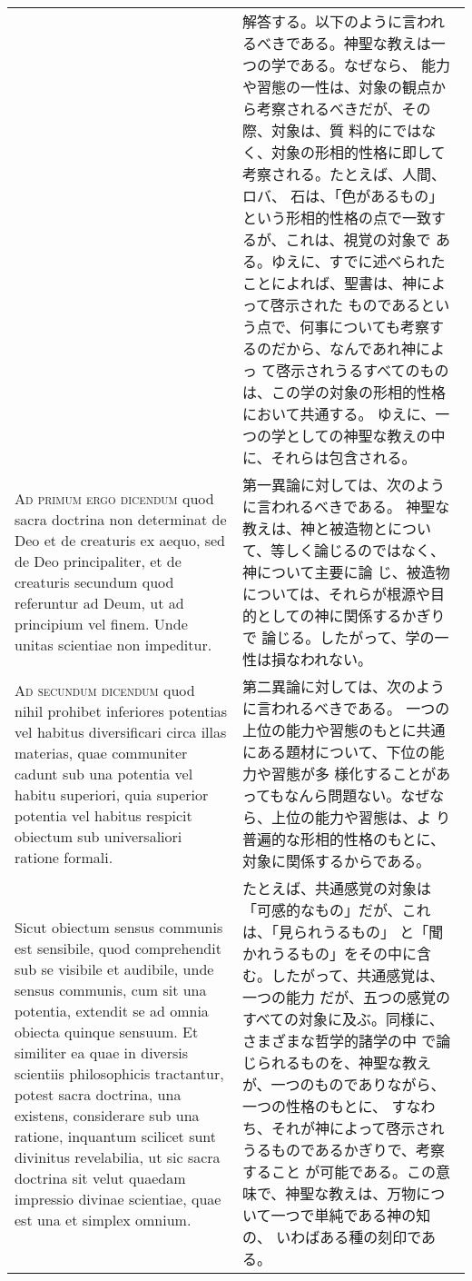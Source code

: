 \documentclass[10pt]{jsarticle} %
\begin{document}
\begin{longtable}{p{21em}p{21em}}
&


解答する。以下のように言われるべきである。神聖な教えは一つの学である。なぜなら、
能力や習態の一性は、対象の観点から考察されるべきだが、その際、対象は、質
料的にではなく、対象の形相的性格に即して考察される。たとえば、人間、ロバ、
石は、「色があるもの」という形相的性格の点で一致するが、これは、視覚の対象で
ある。ゆえに、すでに述べられたことによれば、聖書は、神によって啓示された
ものであるという点で、何事についても考察するのだから、なんであれ神によっ
て啓示されうるすべてのものは、この学の対象の形相的性格において共通する。
ゆえに、一つの学としての神聖な教えの中に、それらは包含される。

\\


{\scshape Ad primum ergo dicendum} quod sacra doctrina
non determinat de Deo et de creaturis ex aequo, sed de Deo
principaliter, et de creaturis secundum quod referuntur ad Deum, ut ad
principium vel finem. Unde unitas scientiae non impeditur.


&

第一異論に対しては、次のように言われるべきである。
神聖な教えは、神と被造物とについて、等しく論じるのではなく、神について主要に論
 じ、被造物については、それらが根源や目的としての神に関係するかぎりで
 論じる。したがって、学の一性は損なわれない。
\\


{\scshape Ad secundum dicendum} quod nihil prohibet
inferiores potentias vel habitus diversificari circa illas materias,
quae communiter cadunt sub una potentia vel habitu superiori, quia
superior potentia vel habitus respicit obiectum sub universaliori
ratione formali. 


&

第二異論に対しては、次のように言われるべきである。
一つの上位の能力や習態のもとに共通にある題材について、下位の能力や習態が多
 様化することがあってもなんら問題ない。なぜなら、上位の能力や習態は、よ
 り普遍的な形相的性格のもとに、対象に関係するからである。

\\

Sicut obiectum sensus communis est sensibile, quod
comprehendit sub se visibile et audibile, unde sensus communis, cum sit
una potentia, extendit se ad omnia obiecta quinque sensuum. Et similiter
ea quae in diversis scientiis philosophicis tractantur, potest sacra
doctrina, una existens, considerare sub una ratione, inquantum scilicet
sunt divinitus revelabilia, ut sic sacra doctrina sit velut quaedam
impressio divinae scientiae, quae est una et simplex omnium.


&

たとえば、共通感覚の対象は「可感的なもの」だが、これは、「見られうるもの」
 と「聞かれうるもの」をその中に含む。したがって、共通感覚は、一つの能力
 だが、五つの感覚のすべての対象に及ぶ。同様に、さまざまな哲学的諸学の中
 で論じられるものを、神聖な教えが、一つのものでありながら、一つの性格のもとに、
 すなわち、それが神によって啓示されうるものであるかぎりで、考察すること
 が可能である。この意味で、神聖な教えは、万物について一つで単純である神の知の、
 いわばある種の刻印である。



\end{longtable}
\end{document}
